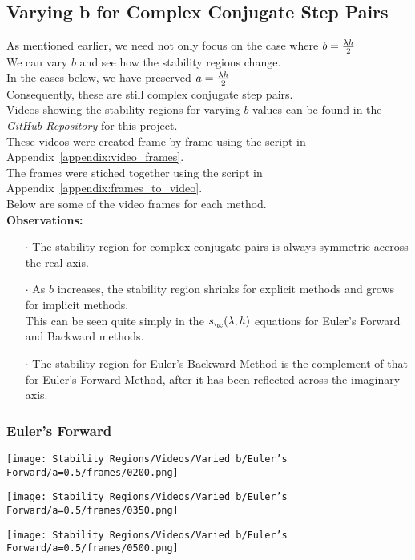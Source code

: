 \subsection{Varying b for Complex Conjugate Step Pairs}
\par As mentioned earlier, we need not only focus on the case where $b = \frac{\lambda h}{2}$\\
We can vary $b$ and see how the stability regions change.\\
In the cases below, we have preserved $a = \frac{\lambda h}{2}$\\
Consequently, these are still complex conjugate step pairs.\\
Videos showing the stability regions for varying $b$ values can be found in the \textit{GitHub Repository}\cite{GitHub_Repo} for this project.\\
These videos were created frame-by-frame using the script in Appendix~\ref{appendix:video_frames}.\\
The frames were stiched together using the script in Appendix~\ref{appendix:frames_to_video}.\\
Below are some of the video frames for each method.\\
\textbf{Observations:}
\begin{itemize}
	\item[$\cdot$] The stability region for complex conjugate pairs is always symmetric accross the real axis.
	      
	\item[$\cdot$] As $b$ increases, the stability region shrinks for explicit methods and grows for implicit methods.\\
        This can be seen quite simply in the $s_{_{\bC}}(\lambda, h)$ equations for Euler's Forward and Backward methods.

        \item[$\cdot$] The stability region for Euler's Backward Method is the complement of that for Euler's Forward Method, after it has been reflected across the imaginary axis.

\end{itemize}
\subsubsection{Euler's Forward}
\vspace*{-0.65cm}
\begin{multicols}{3}
	\begin{center}
		\texttt{[image: Stability Regions/Videos/Varied b/Euler's Forward/a=0.5/frames/0200.png]}
	\end{center}
	\columnbreak{}
	\begin{center}
		\texttt{[image: Stability Regions/Videos/Varied b/Euler's Forward/a=0.5/frames/0350.png]}
	\end{center}
	\columnbreak{}
	\begin{center}
		\texttt{[image: Stability Regions/Videos/Varied b/Euler's Forward/a=0.5/frames/0500.png]}
	\end{center}
\end{multicols}
